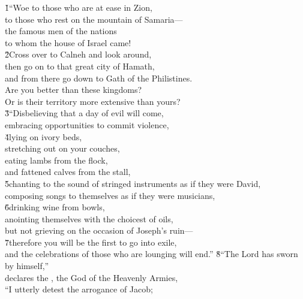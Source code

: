 \begin{poetry}
\poeml {}
\v{1}``Woe to those who are at ease in Zion, \\
\poemll    to those who rest on the mountain of Samaria--- \\
\poeml the famous men of the nations \\
\poemll    to whom the house of Israel came! \\
\poeml \v{2}Cross over to Calneh and look around, \\
\poemll    then go on to that great city of Hamath, \\
\poemlll       and from there go down to Gath of the Philistines. \\
\poeml Are you better than these kingdoms? \\
\poemll    Or is their territory more extensive than yours? \\
\poeml \v{3}``Disbelieving that a day of evil will come, \\
\poemll    embracing opportunities to commit violence, \\
\poeml \v{4}lying on ivory beds, \\
\poemll    stretching out on your couches, \\
\poeml eating lambs from the flock, \\
\poemll    and fattened calves from the stall, \\
\poeml \v{5}chanting to the sound of stringed instruments as if they were David, \\
\poemll    composing songs to themselves as if they were musicians, \\
\poeml \v{6}drinking wine from bowls, \\
\poemll    anointing themselves with the choicest of oils, \\
\poemlll       but not grieving on the occasion of Joseph's ruin--- \\
\poeml \v{7}therefore you will be the first to go into exile, \\
\poemll    and the celebrations of those who are lounging will end.''
\poeml \v{8}``The Lord  has sworn by himself,'' \\
\poemll    declares the , the God of the Heavenly Armies, \\
\poeml ``I utterly detest the arrogance of Jacob; \\

\end{poetry}
